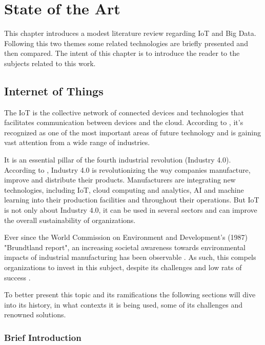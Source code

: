 \chapter{State of the Art}
\label{chap:stateofart}

This chapter introduces a modest literature review regarding \gls{IoT} and Big Data.
Following this two themes some related technologies are briefly presented and then compared.
The intent of this chapter is to introduce the reader to the subjects related to this work.

\section{Internet of Things}
\label{sec:stateofart:iot}

The \gls{IoT} is the collective network of connected devices and technologies that facilitates communication between devices and the cloud. According to \cite{LEE2015431}, it's recognized as one of the most important areas of future technology and is gaining vast attention from a wide range of industries.

It is an essential pillar of the fourth industrial revolution (Industry 4.0). According to \cite{ibm-industry4}, Industry 4.0 is revolutionizing the way companies manufacture, improve and distribute their products. Manufacturers are integrating new technologies, including \gls{IoT}, cloud computing and analytics, AI and machine learning into their production facilities and throughout their operations.
But \gls{IoT} is not only about Industry 4.0, it can be used in several sectors and can improve the overall sustainability of organizations.

Ever since the World Commission on Environment and Development's (1987) "Brundtland report", an increasing societal awareness towards environmental impacts of industrial manufacturing has been observable \parencite{sus}. As such, this compels organizations to invest in this subject, despite its challenges and low rats of success \parencite{iot-fail}.

To better present this topic and its ramifications the following sections will dive into its history, in what contexts it is being used, some of its challenges and renowned solutions.

\subsection{Brief Introduction}
\label{subsec:stateofart:iot:intro}

